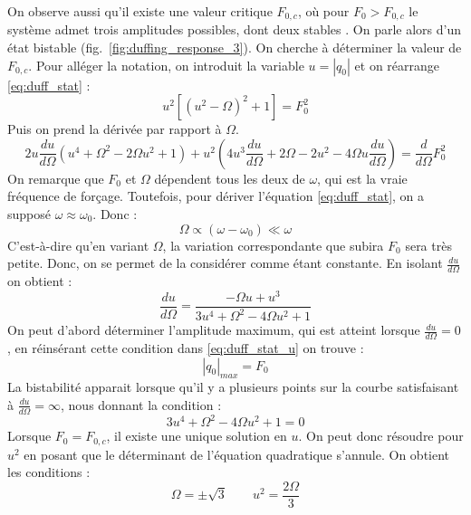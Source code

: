 On observe aussi qu'il existe une valeur critique $F_{0,c}$, où pour $F_0 > F_{0,c}$ le système admet 
trois amplitudes possibles, dont deux stables \cite{landau_mechanics_1976}. On parle alors d'un état bistable (fig.~\ref{fig:duffing_response_3}).
%
On cherche à déterminer la valeur de $F_{0, c}$. Pour alléger la notation, 
on introduit la variable $u = |q_0|$ et on réarrange \eqref{eq:duff_stat} :
%
\begin{equation}
    u^2[(u^2 - \Omega)^2 + 1] = F_0^2
    \label{eq:duff_stat_u}
\end{equation}
%
Puis on prend la dérivée par rapport à $\Omega$.
%
\begin{equation}
    2u\frac{du}{d\Omega}(u^4 + \Omega^2 - 2\Omega u^2 + 1) + u^2(4u^3\frac{du}{d\Omega} + 2\Omega - 2u^2 - 4\Omega u\frac{du}{d\Omega}) = \frac{d}{d\Omega}F_0^2
\end{equation}
%
On remarque que $F_0$ et $\Omega$ dépendent tous les deux de $\omega$, qui est la vraie fréquence de forçage. Toutefois, pour dériver l'équation \eqref{eq:duff_stat}, on a supposé $\omega \approx \omega_0$. Donc : 
%
\begin{equation*}
    \Omega \propto (\omega - \omega_0) \ll \omega
\end{equation*}
%
C'est-à-dire qu'en variant $\Omega$, la variation correspondante que subira $F_0$ sera très petite. Donc, on se permet de la considérer comme étant constante. En isolant $\frac{du}{d\Omega}$ on obtient :
%
\begin{equation}
    \frac{du}{d\Omega} = \frac{-\Omega u + u^3}{3u^4 + \Omega^2 - 4\Omega u^2 + 1}
\end{equation}
%
On peut d'abord déterminer l'amplitude maximum, qui est atteint lorsque $\frac{du}{d\Omega}=0$, en réinsérant cette condition dans \eqref{eq:duff_stat_u} on trouve :
%
\begin{equation*}
    |q_0|_{max} = F_0
\end{equation*}
%
La bistabilité apparait lorsque qu'il y a plusieurs points sur la courbe satisfaisant à $\frac{du}{d\Omega}=\infty$, nous donnant la condition :
%
\begin{equation}
    3u^4 + \Omega^2 - 4\Omega u^2 + 1 = 0
\end{equation}
%
Lorsque $F_0 = F_{0,c}$, il existe une unique solution en $u$. On peut donc résoudre pour $u^2$ en posant que le déterminant de l'équation quadratique s'annule. On obtient les conditions :
%
\begin{equation}
    \Omega = \pm \sqrt{3}
    \qquad
    u^2 = \frac{2\Omega}{3}
\end{equation}
